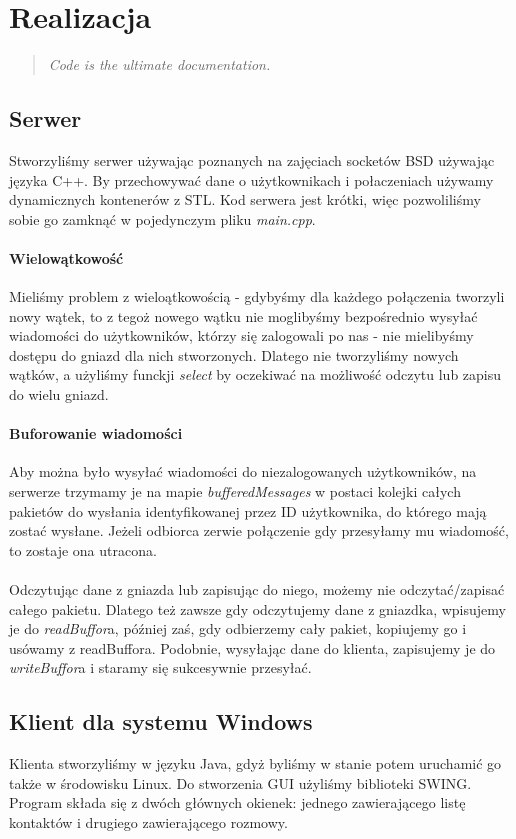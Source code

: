 \documentclass[10pt,a4paper]{article}
\begin{document}
\section{Realizacja}
	\begin{quote}
		\textit{Code is the ultimate documentation.}
	\end{quote}
	\subsection{Serwer}Stworzyliśmy serwer używając poznanych na zajęciach socketów BSD używając języka C++.
	By przechowywać dane o użytkownikach i połaczeniach używamy dynamicznych kontenerów z STL.
	Kod serwera jest krótki, więc pozwoliliśmy sobie go zamknąć w pojedynczym pliku \textit{main.cpp}.
	\paragraph{Wielowątkowość}Mieliśmy problem z wieloątkowością - gdybyśmy dla każdego połączenia tworzyli
	nowy wątek, to z tegoż nowego wątku nie moglibyśmy bezpośrednio wysyłać wiadomości do użytkowników, którzy
	się zalogowali po nas - nie mielibyśmy dostępu do gniazd dla nich stworzonych. Dlatego nie tworzyliśmy nowych
	wątków, a użyliśmy funckji \textit{select} by oczekiwać na możliwość odczytu lub zapisu do wielu gniazd.
	\paragraph{Buforowanie wiadomości}Aby można było wysyłać wiadomości do niezalogowanych użytkowników, na serwerze
	trzymamy je na mapie \textit{bufferedMessages} w postaci kolejki całych pakietów do wysłania identyfikowanej przez
	ID użytkownika, do którego mają zostać wysłane. Jeżeli odbiorca zerwie połączenie gdy przesyłamy mu wiadomość, to
	zostaje ona utracona.
	\paragraph{}Odczytując dane z gniazda lub zapisując do niego, możemy nie odczytać/zapisać całego pakietu.
	Dlatego też zawsze gdy odczytujemy dane z gniazdka, wpisujemy je do \textit{readBuffor}a, później zaś, gdy
	odbierzemy cały pakiet, kopiujemy go i usówamy z readBuffora. Podobnie, wysyłając dane do klienta, zapisujemy je do
	\textit{writeBuffor}a i staramy się sukcesywnie przesyłać.
	
	\subsection{Klient dla systemu Windows}Klienta stworzyliśmy w języku Java, gdyż byliśmy w stanie potem uruchamić go także w środowisku
	Linux. Do stworzenia GUI użyliśmy biblioteki SWING. Program składa się z dwóch głównych okienek: jednego 
	zawierającego listę kontaktów i drugiego zawierającego rozmowy.
\end{document}
